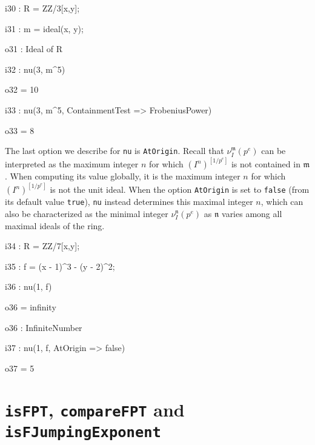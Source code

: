 \documentclass{amsart}
\newcommand{\idealm}{\mathfrak{m}}
\begin{document}
\medskip
{\small
{}
\begin{MyVerbatim}
i30 : R = ZZ/3[x,y];

i31 : m = ideal(x, y);

o31 : Ideal of R

i32 : nu(3, m^5)

o32 = 10

i33 : nu(3, m^5, ContainmentTest => FrobeniusPower)

o33 = 8
\end{MyVerbatim}
}
\medskip


The last option we describe for \texttt{nu} is \texttt{AtOrigin}.
Recall that $\nu_I^\idealm(p^e)$ can be interpreted as the maximum integer $n$ for which $(I^n)^{[1/p^e]}$ is not contained in $\idealm$. 
When computing its value globally, it is the maximum integer $n$ for which $(I^n)^{[1/p^e]}$ is not the unit ideal.
When the option \texttt{AtOrigin} is set to \texttt{false} (from its default value \texttt{true}), \texttt{nu} instead determines this maximal integer $n$, which can also be characterized as the minimal integer $\nu_I^\mathfrak{n}(p^e)$ as $\mathfrak{n}$ varies among all maximal ideals of the ring.  

%

\medskip
{\small
{}
\begin{MyVerbatim}
i34 : R = ZZ/7[x,y];

i35 : f = (x - 1)^3 - (y - 2)^2;

i36 : nu(1, f)

o36 = infinity

o36 : InfiniteNumber

i37 : nu(1, f, AtOrigin => false)

o37 = 5
\end{MyVerbatim}
}


\section{{\tt isFPT}, {\tt compareFPT} and {\tt isFJumpingExponent}}
\label{sec.IsFPT}
\end{document}
